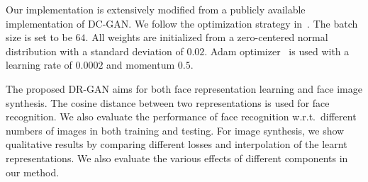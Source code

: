 \documentclass[10pt,journal,compsoc]{IEEEtran}
\begin{document}
Our implementation is extensively modified from a publicly available implementation of DC-GAN. 
We follow the optimization strategy in~\cite{radford2015unsupervised}.
The batch size is set to be $64$. 
All weights are initialized from a zero-centered normal distribution with a standard deviation of $0.02$. 
Adam optimizer~\cite{kingma2014adam} is used with a learning rate of $0.0002$ and momentum $0.5$.

The proposed DR-GAN aims for both face representation learning and face image synthesis. 
The cosine distance between two representations is used for face recognition. 
We also evaluate the performance of face recognition w.r.t.~different numbers of images in both training and testing. 
For image synthesis, we show qualitative results by comparing different losses and interpolation of the learnt representations. 
We also evaluate the various effects of different components in our method. 
\end{document}
